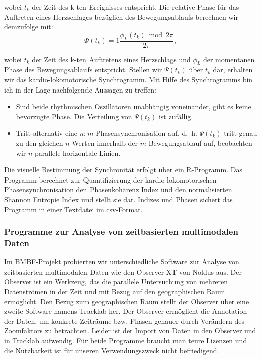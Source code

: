 wobei $t_{k}$ der Zeit des k-ten Ereignisses entspricht. Die relative Phase für das Auftreten eines Herzschlages bezüglich des Bewegungsablaufs berechnen wir demzufolge mit: 
\begin{equation}
	\Psi(t_{k}) = 1 \frac{\phi_{L}(t_{k}) \bmod 2 \pi}{2 \pi}, 
\end{equation}

wobei $t_{k}$ der Zeit des k-ten Auftretens eines Herzschlags und $\phi_{L}$ der momentanen Phase des Bewegungsablaufs entspricht. Stellen wir $\Psi(t_{k})$ über $t_{k}$ dar, erhalten wir das kardio-lokomotorische Synchrogramm. Mit Hilfe des Synchrogramms bin ich in der Lage nachfolgende Aussagen zu treffen: 
\begin{itemize}
	
	\item Sind beide rhythmischen Oszillatoren unabhängig voneinander, gibt es keine bevorzugte Phase. Die Verteilung von $\Psi(t_{k})$ ist zufällig.
	
	\item Tritt alternativ eine $n:m$ Phasensynchronisation auf, d.~h. $\Psi(t_{k})$ tritt genau zu den gleichen $n$ Werten innerhalb der $m$ Bewegungsablauf auf, beobachten wir $n$ parallele horizontale Linien. 
\end{itemize}

Die visuelle Bestimmung der Synchronität erfolgt über ein R-Programm. Das Programm berechnet zur Quantifizierung der kardio-lokomotorischen Phasensynchronisation den Phasenkohärenz Index \citep{Rosenblum2003} und den normalisierten Shannon Entropie Index \citep{Tass1998, Niizeki2005} und stellt sie dar. Indizes und Phasen sichert das Programm in einer Textdatei im \acs{csv}-Format.

\subsubsection{Programme zur Analyse von zeitbasierten multimodalen Daten} 

\label{ssub:programme_zur_analyse_von_zeitbasierten_multimodalen_daten}

Im \acs{BMBF}-Projekt probierten wir unterschiedliche Software zur Analyse von zeitbasierten multimodalen Daten wie den Observer XT von Noldus aus. Der Observer ist ein Werkzeug, das die parallele Untersuchung von mehreren Datenströmen in der Zeit und mit Bezug auf den geographischen Raum ermöglicht. Den Bezug zum geographischen Raum stellt der Observer über eine zweite Software namens Tracklab her. Der Observer ermöglicht die Annotation der Daten, um konkrete Zeiträume bzw. Phasen genauer durch Verändern des Zoomfaktors zu betrachten. Leider ist der Import von Daten in den Observer und in Tracklab aufwendig. Für beide Programme braucht man teure Lizenzen und die Nutzbarkeit ist für unseren Verwendungszweck nicht befriedigend.

